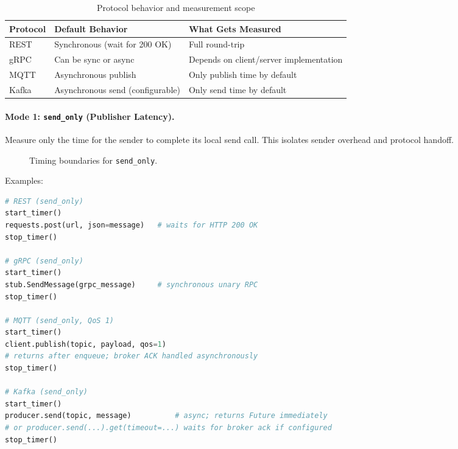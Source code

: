 \begin{table}[H]
\centering
\caption{Protocol behavior and measurement scope}
\label{tab:protocol-behavior-measurement}
\begin{tabular}{lll}
\toprule
\textbf{Protocol} & \textbf{Default Behavior} & \textbf{What Gets Measured} \\
\midrule
REST  & Synchronous (wait for 200 OK)   & Full round-trip \\
gRPC  & Can be sync or async             & Depends on client/server implementation \\
MQTT  & Asynchronous publish             & Only publish time by default \\
Kafka & Asynchronous send (configurable) & Only send time by default \\
\bottomrule
\end{tabular}
\end{table}

\paragraph{Mode 1: \texttt{send\_only} (Publisher Latency).}
Measure only the time for the sender to complete its local send call. This isolates sender overhead and protocol handoff.

\begin{figure}[H]
\centering
{}
\caption{Timing boundaries for \texttt{send\_only}.}
\label{fig:timing-send-only}
\end{figure}

Examples:
\begin{lstlisting}[language=Python]
# REST (send_only)
start_timer()
requests.post(url, json=message)   # waits for HTTP 200 OK
stop_timer()

# gRPC (send_only)
start_timer()
stub.SendMessage(grpc_message)     # synchronous unary RPC
stop_timer()

# MQTT (send_only, QoS 1)
start_timer()
client.publish(topic, payload, qos=1)  
# returns after enqueue; broker ACK handled asynchronously
stop_timer()

# Kafka (send_only)
start_timer()
producer.send(topic, message)          # async; returns Future immediately
# or producer.send(...).get(timeout=...) waits for broker ack if configured
stop_timer()
\end{lstlisting}

